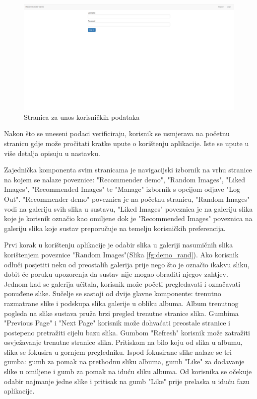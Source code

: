 \documentclass[times, utf8, proizvoljni, numeric]{fer}
\begin{document}
\begin{figure}[H]
	\begin{center}
		\captionsetup{justification=centering}
		\includegraphics[width=1.0\textwidth]{./imgs/demo-preporucitelja-po-sadrzaju/tijek-rada/demo-login.png}
		\caption{Stranica za unos korisničkih podataka}
		\label{fg:demo_login}
	\end{center}
\end{figure}

Nakon što se uneseni podaci verificiraju, korisnik se usmjerava na početnu stranicu gdje može pročitati kratke upute o korištenju aplikacije. Iste se upute u više detalja opisuju u nastavku.

Zajednička komponenta svim stranicama je navigacijski izbornik na vrhu stranice na kojem se nalaze poveznice: "Recommender demo", "Random Images", "Liked Images", "Recommended Images" te "Manage" izbornik s opcijom odjave "Log Out". "Recommender demo" poveznica je na početnu stranicu, "Random Images" vodi na galeriju svih slika u sustavu, "Liked Images" poveznica je na galeriju slika koje je korisnik označio kao omiljene dok je "Recommended Images" poveznica na galeriju slika koje sustav preporučuje na temelju korisničkih preferencija.

Prvi korak u korištenju aplikacije je odabir slika u galeriji nasumičnih slika korištenjem poveznice "Random Images"(Slika \ref{fg:demo_rand}). Ako korisnik odluči posjetiti neku od preostalih galerija prije nego što je označio ikakvu sliku, dobit će poruku upozorenja da sustav nije mogao obraditi njegov zahtjev. Jednom kad se galerija učitala, korisnik može početi pregledavati i označavati ponuđene slike. Sučelje se sastoji od dvije glavne komponente: trenutno razmatrane slike i podskupa slika galerije u obliku albuma. Album trenutnog pogleda na slike sustava pruža brzi pregled trenutne stranice slika. Gumbima "Previous Page" i "Next Page" korisnik može dohvaćati preostale stranice i postepeno pretražiti cijelu bazu slika. Gumbom "Refresh" korisnik može zatražiti osvježavanje trenutne stranice slika. Pritiskom na bilo koju od slika u albumu, slika se fokusira u gornjem pregledniku. Ispod fokusirane slike nalaze se tri gumba: gumb za pomak na prethodnu sliku albuma, gumb "Like" za dodavanje slike u omiljene i gumb za pomak na iduću sliku albuma. Od korisnika se očekuje odabir najmanje jedne slike i pritisak na gumb "Like" prije prelaska u iduću fazu aplikacije.
\end{document}
